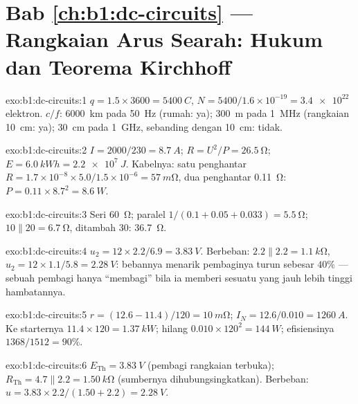 \section*{Bab \ref{ch:b1:dc-circuits} --- Rangkaian Arus Searah: Hukum dan Teorema Kirchhoff}

\begin{solution}{exo:b1:dc-circuits:1}
$q = 1.5 \times 3600 = \qty{5400}{C}$, $N = 5400/1.6\times10^{-19} =
\num{3.4e22}$ elektron. $c/f$: \qty{6000}{km} pada \qty{50}{Hz} (rumah:
ya); \qty{300}{m} pada \qty{1}{MHz} (rangkaian \qty{10}{cm}: ya);
\qty{30}{cm} pada \qty{1}{GHz}, sebanding dengan \qty{10}{cm}: tidak.
\end{solution}

\begin{solution}{exo:b1:dc-circuits:2}
$I = 2000/230 = \qty{8.7}{A}$; $R = U^2/P = \qty{26.5}{\ohm}$; $E =
\qty{6.0}{kWh} = \qty{2.2e7}{J}$. Kabelnya: satu penghantar $R = 1.7\times10^{-8}
\times 5.0/1.5\times10^{-6} = \qty{57}{m\ohm}$, dua penghantar
\qty{0.11}{\ohm}: $P = 0.11 \times 8.7^2 = \qty{8.6}{W}$.
\end{solution}

\begin{solution}{exo:b1:dc-circuits:3}
Seri \qty{60}{\ohm}; paralel $1/(0.1 + 0.05 + 0.033) = \qty{5.5}{\ohm}$;
$10 \parallel 20 = \qty{6.7}{\ohm}$, ditambah $30$: \qty{36.7}{\ohm}.
\end{solution}

\begin{solution}{exo:b1:dc-circuits:4}
$u_2 = 12 \times 2.2/6.9 = \qty{3.83}{V}$. Berbeban: $2.2 \parallel 2.2 =
\qty{1.1}{k\ohm}$, $u_2 = 12 \times 1.1/5.8 = \qty{2.28}{V}$: bebannya
menarik pembaginya turun sebesar $40\%$ --- sebuah pembagi hanya
``membagi'' bila ia memberi sesuatu yang jauh lebih tinggi hambatannya.
\end{solution}

\begin{solution}{exo:b1:dc-circuits:5}
$r = (12.6 - 11.4)/120 = \qty{10}{m\ohm}$; $I_N = 12.6/0.010 =
\qty{1260}{A}$. Ke starternya $11.4 \times 120 = \qty{1.37}{kW}$; hilang
$0.010 \times 120^2 = \qty{144}{W}$; efisiensinya $1368/1512 = 90\%$.
\end{solution}

\begin{solution}{exo:b1:dc-circuits:6}
$E_{\mathrm{Th}} = \qty{3.83}{V}$ (pembagi rangkaian terbuka); $R_{\mathrm{Th}}
= 4.7 \parallel 2.2 = \qty{1.50}{k\ohm}$ (sumbernya dihubungsingkatkan).
Berbeban: $u = 3.83 \times 2.2/(1.50 + 2.2) = \qty{2.28}{V}$.
\end{solution}

